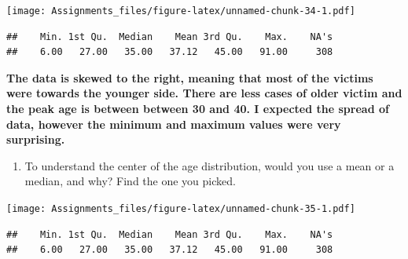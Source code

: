 \documentclass[
]{article}
\newenvironment{Shaded}{\begin{snugshade}}{\end{snugshade}}
\newcommand{\FunctionTok}[1]{\textcolor[rgb]{0.00,0.00,0.00}{#1}}
\newcommand{\NormalTok}[1]{#1}
\newcommand{\SpecialCharTok}[1]{\textcolor[rgb]{0.00,0.00,0.00}{#1}}
\providecommand{\tightlist}{%
  \setlength{\itemsep}{0pt}\setlength{\parskip}{0pt}}
\begin{document}
\begin{Shaded}
\end{Shaded}

\texttt{[image: Assignments\_files/figure-latex/unnamed-chunk-34-1.pdf]}

\begin{Shaded}
\end{Shaded}

\begin{verbatim}
##    Min. 1st Qu.  Median    Mean 3rd Qu.    Max.    NA's 
##    6.00   27.00   35.00   37.12   45.00   91.00     308
\end{verbatim}

\textbf{The data is skewed to the right, meaning that most of the
victims were towards the younger side. There are less cases of older
victim and the peak age is between between 30 and 40. I expected the
spread of data, however the minimum and maximum values were very
surprising.}

\begin{enumerate}
\def\labelenumi{\alph{enumi}.}
\setcounter{enumi}{1}
\tightlist
\item
  To understand the center of the age distribution, would you use a mean
  or a median, and why? Find the one you picked.
\end{enumerate}

\begin{Shaded}
\end{Shaded}

\texttt{[image: Assignments\_files/figure-latex/unnamed-chunk-35-1.pdf]}

\begin{Shaded}
\end{Shaded}

\begin{verbatim}
##    Min. 1st Qu.  Median    Mean 3rd Qu.    Max.    NA's 
##    6.00   27.00   35.00   37.12   45.00   91.00     308
\end{verbatim}
\end{document}
